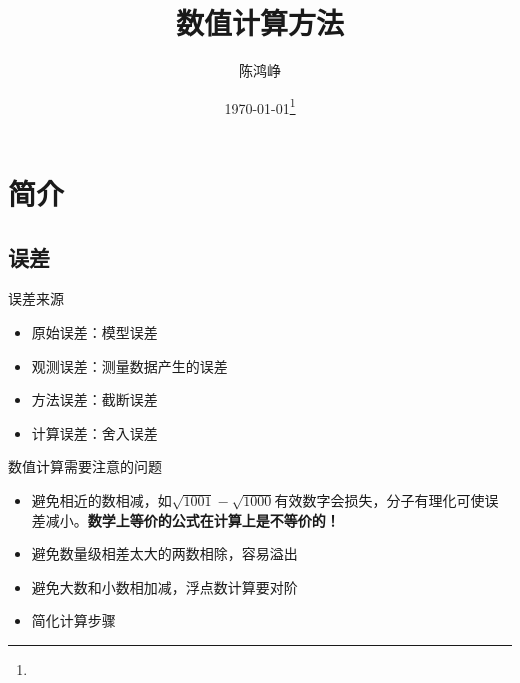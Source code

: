 \documentclass{note}
\title{数值计算方法}
\author{陈鸿峥}
\date{{\builddatemonth\today}\protect\footnote{\text{Build \builddate\today}}}%
\renewcommand{\thefootnote}{\fnsymbol{footnote}}
\begin{document}
\maketitle
\renewcommand{\thefootnote}{\arabic{footnote}}
\setcounter{footnote}{0}

\setcounter{tocdepth}{2}%
\tableofcontents
\bigskip\bigskip\bigskip

\section{简介}
\subsection{误差}
误差来源
\begin{itemize}
	\item 原始误差：模型误差
	\item 观测误差：测量数据产生的误差
	\item 方法误差：截断误差
	\item 计算误差：舍入误差
\end{itemize}
数值计算需要注意的问题
\begin{itemize}
	\item 避免相近的数相减，如$\sqrt{1001}-\sqrt{1000}$有效数字会损失，分子有理化可使误差减小。\textbf{数学上等价的公式在计算上是不等价的！}
	\item 避免数量级相差太大的两数相除，容易溢出
	\item 避免大数和小数相加减，浮点数计算要对阶
	\item 简化计算步骤
\end{itemize}
\end{document}
